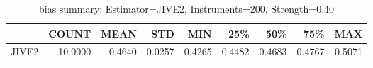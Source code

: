 \begin{table}[ht]
\centering
\caption{bias summary: Estimator=JIVE2, Instruments=200, Strength=0.40}
\begin{tabular}{lrrrrrrrr}
\toprule
 & COUNT & MEAN & STD & MIN & 25\% & 50\% & 75\% & MAX \\
\midrule
JIVE2 & 10.0000 & 0.4640 & 0.0257 & 0.4265 & 0.4482 & 0.4683 & 0.4767 & 0.5071 \\
\bottomrule
\end{tabular}
\end{table}
